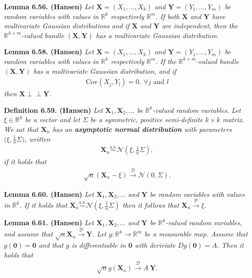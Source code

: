 \documentclass[a4paper,10pt,openany]{book}
\begin{document}
\textbf{Lemma 6.56. (Hansen)} \emph{Let \(\mathbf{X}=(X_1,...,X_k)\) and \(\mathbf{Y}=(Y_1,...,Y_m)\) be random variables with values in \(\mathbb{R}^k\) respectively \(\mathbb{R}^m\). If both \(\mathbf{X}\) and \(\mathbf{Y}\) have multivariate Gaussian distributions and if \(\mathbf{X}\) and \(\mathbf{Y}\) are independent, then the \(\mathbb{R}^{k+m}\)-valued bundle \((\mathbf{X},\mathbf{Y})\) has a multivariate Gaussian distribution.}

\textbf{Lemma 6.58. (Hansen)} \emph{Let \(\mathbf{X}=(X_1,...,X_k)\) and \(\mathbf{Y}=(Y_1,...,Y_m)\) be random variables with values in \(\mathbb{R}^k\) respectively \(\mathbb{R}^m\). If the \(\mathbb{R}^{k+m}\)-valued bundle \((\mathbf{X},\mathbf{Y})\) has a multivariate Gaussian distribution, and if}
\begin{align*}
    \text{Cov}(X_j,Y_l)=0,\ \forall j\text{ and }l
\end{align*}
\emph{then \(\mathbf{X}\perp \!\!\! \perp\mathbf{Y}\).}

\textbf{Definition 6.59. (Hansen)} \emph{Let \(\mathbf{X}_1,\mathbf{X}_2,...\) be \(\mathbb{R}^k\)-valued random variables. Let \(\xi\in\mathbb{R}^k\) be a vector and let \(\Sigma\) be a symmetric, positive semi-definite \(k\times k\) matrix.}
\emph{We sat that \(\mathbf{X}_n\) has an \textbf{asymptotic normal distribution} with parameters \(\big(\xi,\frac{1}{n}\Sigma\big)\), written}
\begin{align*}
    \mathbf{X}_n\stackrel{\text{a.s.}}{\sim}\mathcal{N}\left(\xi,\frac{1}{n}\Sigma\right),
\end{align*}
\emph{if it holds that}
\begin{align*}
    \sqrt{n}(\mathbf{X}_n-\xi)\stackrel{\mathcal{D}}{\to} \mathcal{N}(0,\Sigma).
\end{align*}

\textbf{Lemma 6.60. (Hansen)} \emph{Let \(\mathbf{X}_1,\mathbf{X}_2,...\) and \(\mathbf{Y}\) be random variables with values in \(\mathbb{R}^k\). If it holds that \(\mathbf{X}_n\stackrel{\text{a.s.}}{\sim} \mathcal{N}(\xi,\frac{1}{n}\Sigma)\) then it follows that \(\mathbf{X}_n\stackrel{\text{P}}{\to}\xi\).}

\textbf{Lemma 6.61. (Hansen)} \emph{Let \(\mathbf{X}_1,\mathbf{X}_2,...\) and \(\mathbf{Y}\) be \(\mathbb{R}^k\)-valued random variables, and assume that \(\sqrt{n}\mathbf{X}_n\stackrel{\mathcal{D}}{\to} \mathbf{Y}\). Let \(g : \mathbb{R}^k\to \mathbb{R}^m\) be a measurable map. Assume that \(g(\mathbf{0})=\mathbf{0}\) and that \(g\) is differentiable in \(\mathbf{0}\) with deriviate \(Dg(\mathbf{0})=A\). Then it holds that}
\begin{align*}
    \sqrt{n}g(\mathbf{X}_n)\stackrel{\mathcal{D}}{\to} A\ \mathbf{Y}.
\end{align*}
\end{document}
